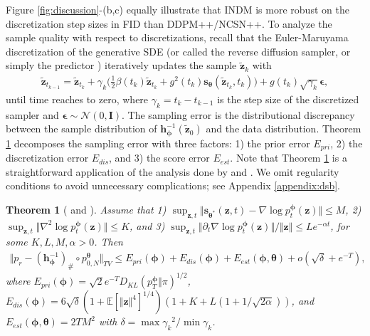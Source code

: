 \documentclass{article}
\newtheorem{theorem}{Theorem}\newtheorem{proposition}{Proposition}
\theoremstyle{definition}
\theoremstyle{remark}
\begin{document}
	Figure \ref{fig:discussion}-(b,c) equally illustrate that INDM is more robust on the discretization step sizes in FID than DDPM++/NCSN++. To analyze the sample quality with respect to discretizations, recall that the Euler-Maruyama discretization of the generative SDE (or called the reverse diffusion sampler, or simply the predictor \cite{song2020score}) iteratively updates the sample $\mathbf{\tilde{z}}_{k}$ with
	\begin{align*}
	\mathbf{\tilde{z}}_{t_{k-1}}=\mathbf{\tilde{z}}_{t_{k}}+\gamma_{k}\bigg(\frac{1}{2}\beta(t_{k})\mathbf{\tilde{z}}_{t_{k}}+g^{2}(t_{k})\mathbf{s}_{\bm{\theta}}(\mathbf{\tilde{z}}_{t_{k}},t_{k})\bigg)+g(t_{k})\sqrt{\gamma_{k}}\bm{\epsilon},
	\end{align*}
	until time reaches to zero, where $\gamma_{k}=t_{k}-t_{k-1}$ is the step size of the discretized sampler and $\bm{\epsilon}\sim \mathcal{N}(0,\mathbf{I})$. The sampling error is the distributional discrepancy between the sample distribution of $\mathbf{h}_{\bm{\phi}}^{-1}(\mathbf{\tilde{z}}_{0})$ and the data distribution. Theorem \ref{thm:dsb} decomposes the sampling error with three factors: 1) the prior error $E_{pri}$, 2) the discretization error $E_{dis}$, and 3) the score error $E_{est}$. Note that Theorem \ref{thm:dsb} is a straightforward application of the analysis done by \citet{de2021diffusion} and \citet{guth2022wavelet}. We omit regularity conditions to avoid unnecessary complications; see Appendix \ref{appendix:dsb}.
	\begin{theorem}[\citet{de2021diffusion} and \citet{guth2022wavelet}]\label{thm:dsb}
		Assume that 1) $\sup_{\mathbf{z},t}\Vert\mathbf{s}_{\bm{\theta}^{*}}(\mathbf{z},t)-\nabla\log{p_{t}^{\bm{\phi}}(\mathbf{z})}\Vert\le M$, 2) $\sup_{\mathbf{z},t}\Vert\nabla^{2}\log{p_{t}^{\bm{\phi}}(\mathbf{z})}\Vert\le K$, and 3) $\sup_{\mathbf{z},t}\Vert\partial_{t}\nabla\log{p_{t}^{\bm{\phi}}(\mathbf{z})}\Vert/\Vert\mathbf{z}\Vert\le L e^{-\alpha t}$, for some $K,L,M,\alpha>0$. Then
		\begin{align*}
		\Vert p_{r}-(\mathbf{h}_{\bm{\phi}}^{-1})_{\#}\circ p_{0,N}^{\bm{\theta}}\Vert_{TV}\le E_{pri}(\bm{\phi})+E_{dis}(\bm{\phi})+E_{est}(\bm{\phi},\bm{\theta})+o(\sqrt{\delta}+e^{-T}),
		\end{align*}
		where $E_{pri}(\bm{\phi})=\sqrt{2}e^{-T}D_{KL}(p_{T}^{\bm{\phi}}\Vert\pi)^{1/2}$, $E_{dis}(\bm{\phi})=6\sqrt{\delta}(1+\mathbb{E}[\Vert\mathbf{z}\Vert^{4}]^{1/4})(1+K+L(1+1/\sqrt{2\alpha}))$, and $E_{est}(\bm{\phi},\bm{\theta})=2TM^{2}$ with $\delta=\max{\gamma_{k}}^{2}/\min{\gamma_{k}}$.
	\end{theorem}
	
\end{document}
